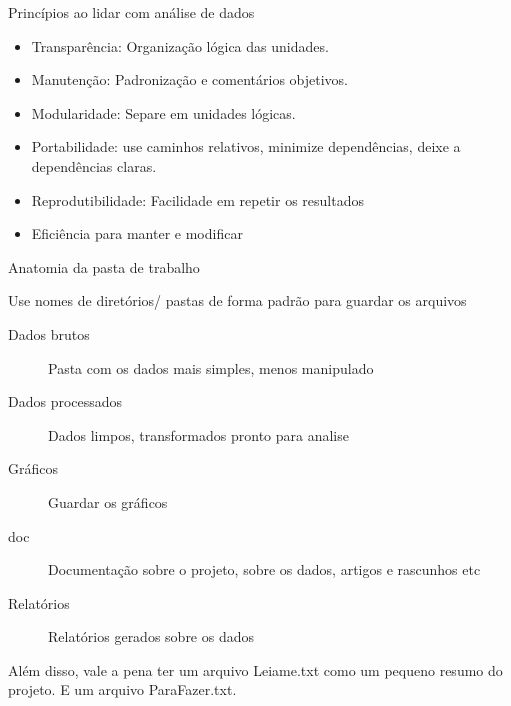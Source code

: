 \documentclass[handout]{beamer}
\begin{document}
\begin{frame}{Princípios ao lidar com análise de dados}

  \begin{itemize}
    
  \item Transparência: Organização lógica das unidades.
  \item Manutenção: Padronização e comentários objetivos.
    
  \item Modularidade: Separe em unidades lógicas.
    
  \item Portabilidade: use caminhos relativos, minimize dependências, deixe a dependências claras.
    
  \item Reprodutibilidade: Facilidade em repetir os resultados

    
  \item Eficiência para manter e modificar 
    \end{itemize}

   
\end{frame}




  \begin{frame}{Anatomia da pasta de trabalho}

    Use nomes de diretórios/ pastas de forma padrão para guardar os arquivos

    \begin{description}
      
    \item[Dados brutos] Pasta com os dados mais simples, menos manipulado
    \item[Dados processados] Dados limpos, transformados pronto para analise
      
    \item[Gráficos] Guardar os gráficos
      
    \item[doc] Documentação sobre o projeto, sobre os dados, artigos e rascunhos etc 
    \item[Relatórios] Relatórios gerados sobre os dados   
    \end{description}

    Além disso, vale a pena ter um arquivo Leiame.txt como um pequeno resumo do projeto. E um arquivo ParaFazer.txt.
    
    \end{frame}
\end{document}
